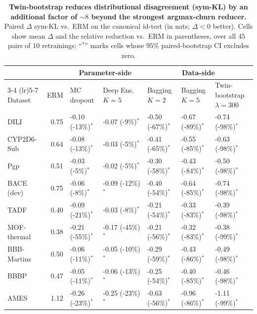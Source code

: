 \begin{table}[h]
  \centering
  \caption{\textbf{\boldmath Twin-bootstrap reduces distributional disagreement (sym-KL) by an additional factor of $\sim$$8$ beyond the strongest argmax-churn reducer.}  Paired $\Delta$ sym-KL vs.\ ERM on the canonical id-test (in nats; $\Delta < 0$ better).  Cells show mean $\Delta$ and the relative reduction vs.\ ERM in parentheses, over all $45$ pairs of $10$ retrainings; ``$^{*}$'' marks cells whose $95\%$ paired-bootstrap CI excludes zero.}
  \label{tab:distributional}
  \scriptsize
  \begin{tabular}{lrll@{\hspace{1.0em}}lll}
    \toprule
    & & \multicolumn{2}{c}{Parameter-side} & \multicolumn{3}{c}{Data-side} \\
    \cmidrule(lr){3-4} \cmidrule(lr){5-7}
    Dataset & ERM & MC dropout & Deep Ens.\ $K{=}5$ & Bagging $K{=}2$ & Bagging $K{=}5$ & Twin-bootstrap $\lambda{=}300$ \\
    \midrule
    DILI & 0.75 & -0.10 (-13\%)$^{*}$ & -0.07 (-9\%)$^{*}$ & -0.50 (-67\%)$^{*}$ & -0.67 (-89\%)$^{*}$ & -0.74 (-98\%)$^{*}$ \\
    CYP2D6-Sub & 0.64 & -0.08 (-13\%)$^{*}$ & -0.03 (-5\%)$^{*}$ & -0.41 (-65\%)$^{*}$ & -0.55 (-85\%)$^{*}$ & -0.63 (-98\%)$^{*}$ \\
    Pgp & 0.51 & -0.03 (-5\%)$^{*}$ & -0.02 (-5\%)$^{*}$ & -0.30 (-58\%)$^{*}$ & -0.43 (-84\%)$^{*}$ & -0.50 (-98\%)$^{*}$ \\
    BACE\,(dev) & 0.75 & -0.06 (-8\%)$^{*}$ & -0.09 (-12\%)$^{*}$ & -0.40 (-54\%)$^{*}$ & -0.64 (-85\%)$^{*}$ & -0.74 (-98\%)$^{*}$ \\
    TADF & 0.40 & -0.09 (-21\%)$^{*}$ & -0.03 (-8\%)$^{*}$ & -0.21 (-54\%)$^{*}$ & -0.33 (-83\%)$^{*}$ & -0.39 (-98\%)$^{*}$ \\
    MOF-thermal & 0.38 & -0.21 (-55\%)$^{*}$ & -0.17 (-45\%)$^{*}$ & -0.21 (-56\%)$^{*}$ & -0.32 (-83\%)$^{*}$ & -0.38 (-99\%)$^{*}$ \\
    BBB-Martins & 0.50 & -0.06 (-11\%)$^{*}$ & -0.05 (-10\%)$^{*}$ & -0.29 (-59\%)$^{*}$ & -0.43 (-86\%)$^{*}$ & -0.49 (-98\%)$^{*}$ \\
    BBBP & 0.47 & -0.05 (-11\%)$^{*}$ & -0.06 (-13\%)$^{*}$ & -0.25 (-54\%)$^{*}$ & -0.40 (-85\%)$^{*}$ & -0.46 (-98\%)$^{*}$ \\
    AMES & 1.12 & -0.26 (-23\%)$^{*}$ & -0.25 (-23\%)$^{*}$ & -0.63 (-56\%)$^{*}$ & -0.96 (-86\%)$^{*}$ & -1.11 (-99\%)$^{*}$ \\
    \bottomrule
  \end{tabular}
\end{table}
